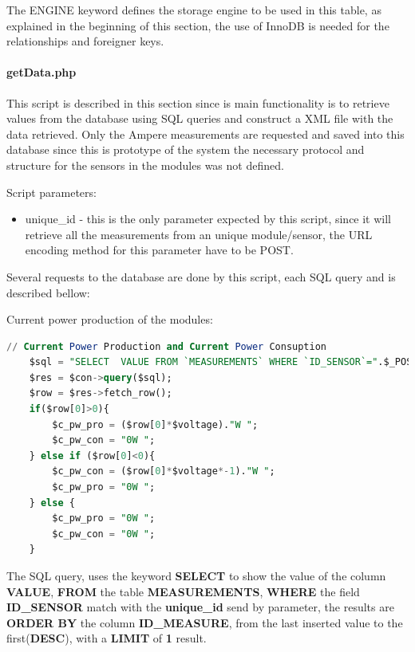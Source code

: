 The ENGINE keyword defines the storage engine to be used in this table, as explained in the beginning of this section, the use of InnoDB is needed for the relationships and foreigner keys.

%
%
%
%
%
%



\paragraph{getData.php} This script is described in this section since is main functionality is to retrieve values from the database using SQL queries and construct a XML file with the data retrieved. Only the Ampere measurements are requested and saved into this database since this is prototype of the system the necessary protocol and structure for the sensors in the modules was not defined.

Script parameters:
\begin{itemize}
	\item unique\_id - this is the only parameter expected by this script, since it will retrieve all the measurements from an unique module/sensor, the URL encoding method for this parameter have to be POST.
\end{itemize}

Several requests to the database are done by this script, each SQL query and is described bellow:

Current power production of the modules:
\begin{lstlisting}[language=sql]
// Current Power Production and Current Power Consuption
	$sql = "SELECT  VALUE FROM `MEASUREMENTS` WHERE `ID_SENSOR`=".$_POST['unique_id']." ORDER BY ID_MEASURE DESC LIMIT 1";
	$res = $con->query($sql);
	$row = $res->fetch_row();
	if($row[0]>0){
		$c_pw_pro = ($row[0]*$voltage)."W ";
		$c_pw_con = "0W ";
	} else if ($row[0]<0){
		$c_pw_con = ($row[0]*$voltage*-1)."W ";
		$c_pw_pro = "0W ";
	} else {
		$c_pw_pro = "0W ";
		$c_pw_con = "0W ";
	}
\end{lstlisting}

The SQL query, uses the keyword \textbf{SELECT} to show the value of the column \textbf{VALUE}, \textbf{FROM} the table \textbf{MEASUREMENTS}, \textbf{WHERE} the field \textbf{ID\_SENSOR} match with the \textbf{unique\_id} send by parameter, the results are \textbf{ORDER BY} the column \textbf{ID\_MEASURE}, from the last inserted value to the first(\textbf{DESC}), with a \textbf{LIMIT} of \textbf{1} result.

